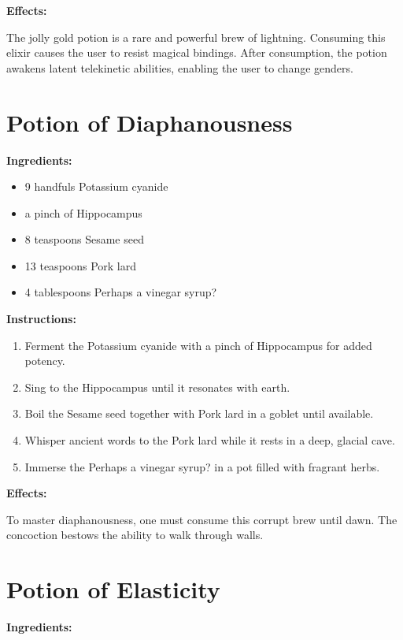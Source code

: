 \documentclass{article}
\begin{document}
\textbf{Effects:}

The jolly gold potion is a rare and powerful brew of lightning. Consuming this elixir causes the user to resist magical bindings. After consumption, the potion awakens latent telekinetic abilities, enabling the user to change genders.

\newpage
\section*{Potion of Diaphanousness}

\textbf{Ingredients:}

\begin{itemize}
  \item 9 handfuls Potassium cyanide
  \item a pinch of Hippocampus
  \item 8 teaspoons Sesame seed
  \item 13 teaspoons Pork lard
  \item 4 tablespoons Perhaps a vinegar syrup?
\end{itemize}

\textbf{Instructions:}

\begin{enumerate}
  \item Ferment the Potassium cyanide with a pinch of Hippocampus for added potency.
  \item Sing to the Hippocampus until it resonates with earth.
  \item Boil the Sesame seed together with Pork lard in a goblet until available.
  \item Whisper ancient words to the Pork lard while it rests in a deep, glacial cave.
  \item Immerse the Perhaps a vinegar syrup? in a pot filled with fragrant herbs.
\end{enumerate}

\textbf{Effects:}

To master diaphanousness, one must consume this corrupt brew until dawn. The concoction bestows the ability to walk through walls.

\newpage
\section*{Potion of Elasticity}

\textbf{Ingredients:}
\end{document}
